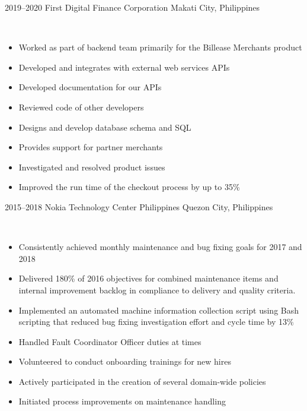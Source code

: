 \documentclass[print]{cv-style}          %
\begin{document}
\begin{entrylist}
\entry
  {2019--2020}
  {First Digital Finance Corporation}
  {Makati City, Philippines}
  {\\
  \begin{itemize}
    \item Worked as part of backend team primarily for the Billease Merchants product
    \item Developed and integrates with external web services APIs
    \item Developed documentation for our APIs
    \item Reviewed code of other developers
    \item Designs and develop database schema and SQL
    \item Provides support for partner merchants
    \item Investigated and resolved product issues
    \item Improved the run time of the checkout process by up to 35\% 
 \end{itemize}}
\entry
  {2015--2018}
  {Nokia Technology Center Philippines}
  {Quezon City, Philippines}
  {\\
  \begin{itemize}
    \item Consistently achieved monthly maintenance and bug fixing goals for 2017 and 2018 
    \item Delivered 180\% of 2016 objectives for combined maintenance items and internal improvement backlog in compliance to delivery and quality criteria. 
    \item Implemented an automated machine information collection script using Bash scripting that reduced bug fixing investigation effort and cycle time by 13\% 
    \item Handled Fault Coordinator Officer duties at times 
    \item Volunteered to conduct onboarding trainings for new hires 
    \item Actively participated in the creation of several domain-wide policies 
    \item Initiated process improvements on maintenance handling  
  \end{itemize}}

\end{entrylist}
\end{document}
